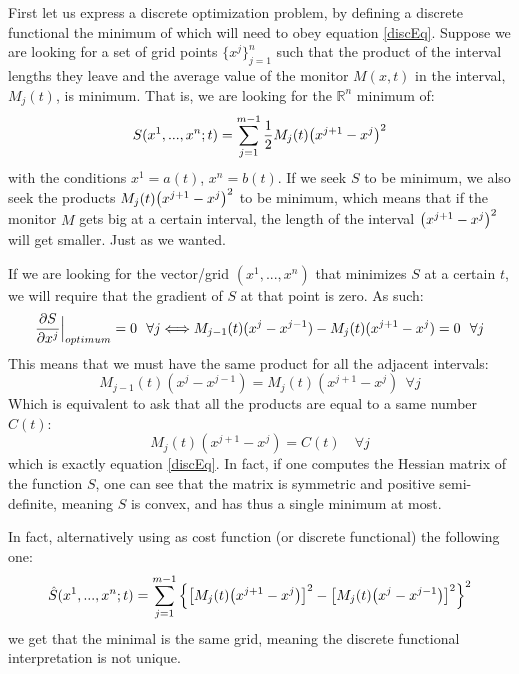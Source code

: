 \documentclass[11pt, a4paper]{article} %
\newcommand{\R}{\mathbb{R}} %
\begin{document}
First let us express a discrete optimization problem, by defining a discrete functional the minimum of which will need to obey equation \eqref{discEq}. Suppose we are looking for a set of grid points $\{x^j \}_{j=1}^n$ such that the product of the interval lengths they leave and the average value of the monitor $M(x,t)$ in the interval, $M_j(t)$, is minimum. That is, we are looking for the $\R^n$ minimum of:  \vspace{-0.1cm}
\begin{equation}\label{discFunc}
S( x^1,...,x^n;t)=\sum_{j=1}^{m-1} \frac{1}{2} M_j(t) \qty(x^{j+1}-x^j)^2 \vspace{-0.1cm}
\end{equation}
with the conditions $x^1=a(t)$, $x^n=b(t)$. If we seek $S$ to be minimum, we also seek the products $M_j(t) \qty(x^{j+1}-x^j)^2$ to be minimum, which means that if the monitor $M$ gets big at a certain interval, the length of the interval $\qty(x^{j+1}-x^j)^2$ will get smaller. Just as we wanted.

If we are looking for the vector/grid $(x^1,...,x^n)$ that minimizes $S$ at a certain $t$, we will require that the gradient of $S$ at that point is zero. As such:
\begin{equation}
\pdv{S}{x^j}\Big\rvert_{optimum}=0\ \ \forall j\Longleftrightarrow M_{j-1}(t)(x^j-x^{j-1})-M_j(t)(x^{j+1}-x^j)=0\ \ \forall j
\end{equation}
This means that we must have the same product for all the adjacent intervals:
\begin{equation}
 M_{j-1}(t)(x^j-x^{j-1})=M_j(t)(x^{j+1}-x^j)\ \ \forall j
\end{equation}
Which is equivalent to ask that all the products are equal to a same number $C(t)$:
\begin{equation}
M_j(t)(x^{j+1}-x^j)=C(t) \quad \forall j
\end{equation}
which is exactly equation \eqref{discEq}. In fact, if one computes the Hessian matrix of the function $S$, one can see that the matrix is symmetric and positive semi-definite, meaning $S$ is convex, and has thus a single minimum at most. 

In fact, alternatively using as cost function (or discrete functional) the following one:\vspace{-0.1cm}
\begin{equation}
\hat{S}(x^1,...,x^n;t)=\sum_{j=1}^{m-1} \qty{\qty[ M_j(t) \qty(x^{j+1}-x^j)]^2-\qty[ M_j(t) \qty(x^{j}-x^{j-1})]^2}^2\vspace{-0.1cm}
\end{equation}
we get that the minimal is the same grid, meaning the discrete functional interpretation is not unique.
\end{document}
